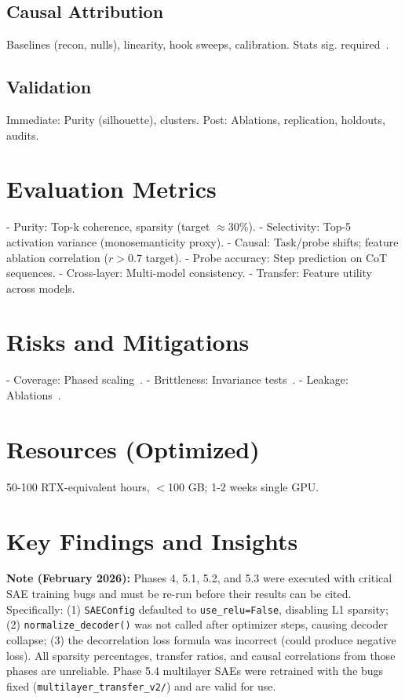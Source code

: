 \documentclass{article}
\begin{document}
\subsection{Causal Attribution}
Baselines (recon, nulls), linearity, hook sweeps, calibration. Stats sig. required~\citep{ScalingMonosemanticityBlog}.

\subsection{Validation}
Immediate: Purity (silhouette), clusters. Post: Ablations, replication, holdouts, audits.

\section{Evaluation Metrics}
- Purity: Top-k coherence, sparsity (target $\approx 30\%$).
- Selectivity: Top-5 activation variance (monosemanticity proxy).
- Causal: Task/probe shifts; feature ablation correlation ($r > 0.7$ target).
- Probe accuracy: Step prediction on CoT sequences.
- Cross-layer: Multi-model consistency.
- Transfer: Feature utility across models.

\section{Risks and Mitigations}
- Coverage: Phased scaling~\citep{SAE-Empirical}.
- Brittleness: Invariance tests~\citep{Li2025InterpretabilityIllusions}.
- Leakage: Ablations~\citep{SAE-Identifiability}.

\section{Resources (Optimized)}
50-100 RTX-equivalent hours, $<$100 GB; 1-2 weeks single GPU.

\section{Key Findings and Insights}

\textbf{Note (February 2026):} Phases 4, 5.1, 5.2, and 5.3 were executed with critical SAE training bugs and must be re-run before their results can be cited. Specifically: (1) \texttt{SAEConfig} defaulted to \texttt{use\_relu=False}, disabling L1 sparsity; (2) \texttt{normalize\_decoder()} was not called after optimizer steps, causing decoder collapse; (3) the decorrelation loss formula was incorrect (could produce negative loss). All sparsity percentages, transfer ratios, and causal correlations from those phases are unreliable. Phase 5.4 multilayer SAEs were retrained with the bugs fixed (\texttt{multilayer\_transfer\_v2/}) and are valid for use.
\end{document}
